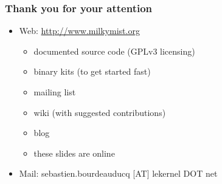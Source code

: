 \documentclass{beamer}
\begin{document}
\frame
{
  \frametitle{Thank you for your attention}
  \begin{itemize}
  \item Web: \url{http://www.milkymist.org}
  \begin{itemize}
  \item documented source code (GPLv3 licensing)
  \item binary kits (to get started fast)
  \item mailing list
  \item wiki (with suggested contributions)
  \item blog
  \item these slides are online
  \end{itemize}
  \item Mail: sebastien.bourdeauducq [AT] lekernel DOT net
  \end{itemize}

  \begin{center}
  \end{center}
}
\end{document}
